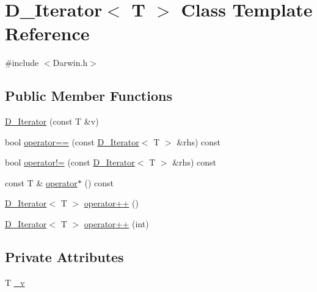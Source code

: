 \hypertarget{classD__Iterator}{\section{D\-\_\-\-Iterator$<$ T $>$ Class Template Reference}
\label{classD__Iterator}
}


{\ttfamily \#include $<$Darwin.\-h$>$}

\subsection*{Public Member Functions}
\begin{DoxyCompactItemize}
\item 
\hyperlink{classD__Iterator_a1c16a0f2f6e6ddec7eebfe51c227ccdd}{D\-\_\-\-Iterator} (const T \&v)
\item 
bool \hyperlink{classD__Iterator_a82582b8527183bafe24a39dd1248a288}{operator==} (const \hyperlink{classD__Iterator}{D\-\_\-\-Iterator}$<$ T $>$ \&rhs) const 
\item 
bool \hyperlink{classD__Iterator_ace12f5b9cf426fda19e80878e1574265}{operator!=} (const \hyperlink{classD__Iterator}{D\-\_\-\-Iterator}$<$ T $>$ \&rhs) const 
\item 
const T \& \hyperlink{classD__Iterator_ab54f2b247856271313ba046d55587f41}{operator$\ast$} () const 
\item 
\hyperlink{classD__Iterator}{D\-\_\-\-Iterator}$<$ T $>$ \hyperlink{classD__Iterator_ac0619be124af0635f017d203bddddac1}{operator++} ()
\item 
\hyperlink{classD__Iterator}{D\-\_\-\-Iterator}$<$ T $>$ \hyperlink{classD__Iterator_a969ab261486f20c4f9619cc924699ffb}{operator++} (int)
\end{DoxyCompactItemize}
\subsection*{Private Attributes}
\begin{DoxyCompactItemize}
\item 
T \hyperlink{classD__Iterator_a707d5192d654a38f9246263ad98b966d}{\-\_\-v}
\end{DoxyCompactItemize}


